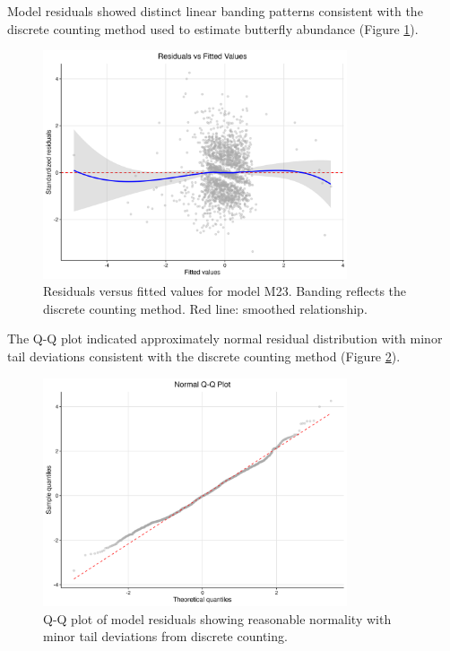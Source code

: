 Model residuals showed distinct linear banding patterns consistent with the discrete counting method used to estimate butterfly abundance (Figure \ref{fig:residuals}).

\begin{figure}[htbp]
\centering
\includegraphics[width=0.8\textwidth]{supplemental/results/thesis_exports/figures/residuals_vs_fitted.png}
\caption{Residuals versus fitted values for model M23. Banding reflects the discrete counting method. Red line: smoothed relationship.}
\label{fig:residuals}
\end{figure}

The Q-Q plot indicated approximately normal residual distribution with minor tail deviations consistent with the discrete counting method (Figure \ref{fig:qqplot}).

\begin{figure}[htbp]
\centering
\includegraphics[width=0.8\textwidth]{supplemental/results/thesis_exports/figures/qq_plot.png}
\caption{Q-Q plot of model residuals showing reasonable normality with minor tail deviations from discrete counting.}
\label{fig:qqplot}
\end{figure}
